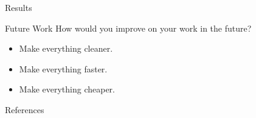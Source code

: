 \documentclass[final,dvipsnames]{beamer}
\newlength{\sepwidth}
\newlength{\colwidth}
\newcommand{\separatorcolumn}{\begin{column}{\sepwidth}\end{column}}
\begin{document}
\begin{frame}[t, fragile]
\begin{columns}[t]
\begin{column}{\colwidth}
\begin{block}{Results}
	\end{block}

	\begin{exampleblock}{Future Work}
		How would you improve on your work in the future?
		\begin{itemize}
			\item Make everything cleaner.
			\item Make everything faster.
			\item Make everything cheaper.
		\end{itemize}
	\end{exampleblock}

	\begin{block}{References}
		\footnotesize{}
	\end{block}

\end{column}

\separatorcolumn
\end{columns}
\end{frame}
\end{document}
